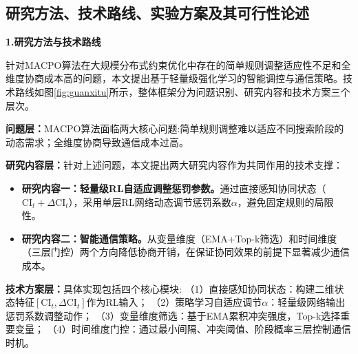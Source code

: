 \begin{titlepage}
\setcounter{page}{8}
\makeatletter
\newpage
{}
\makeatother
\section{研究方法、技术路线、实验方案及其可行性论述}


\noindent
\textbf{1.研究方法与技术路线}

\par
\indent
针对MACPO算法在大规模分布式约束优化中存在的简单规则调整适应性不足和全维度协商成本高的问题，本文提出基于轻量级强化学习的智能调控与通信策略。技术路线如图\ref{fig:guanxitu}所示，整体框架分为问题识别、研究内容和技术方案三个层次。

\par
\indent
\textbf{问题层：}MACPO算法面临两大核心问题:简单规则调整难以适应不同搜索阶段的动态需求；全维度协商导致通信成本过高。

\par
\indent
\textbf{研究内容层：}针对上述问题，本文提出两大研究内容作为共同作用的技术支撑：

\begin{itemize}
\item \textbf{研究内容一：轻量级RL自适应调整惩罚参数。}通过直接感知协同状态（$\text{CI}_t + \Delta\text{CI}_t$），采用单层RL网络动态调节惩罚系数$\alpha$，避免固定规则的局限性。

\item \textbf{研究内容二：智能通信策略。}从变量维度（EMA+Top-k筛选）和时间维度（三层门控）两个方向降低协商开销，在保证协同效果的前提下显著减少通信成本。
\end{itemize}

\par
\indent
\textbf{技术方案层：}具体实现包括四个核心模块:
（1）直接感知协同状态：构建二维状态特征$[\text{CI}_t, \Delta\text{CI}_t]$作为RL输入；
（2）策略学习自适应调节$\alpha$：轻量级网络输出惩罚系数调整动作；
（3）变量维度筛选：基于EMA累积冲突强度，Top-k选择重要变量；
（4）时间维度门控：通过最小间隔、冲突阈值、阶段概率三层控制通信时机。


\end{titlepage}
